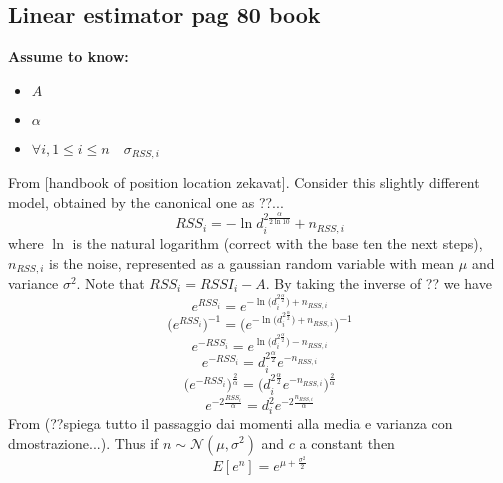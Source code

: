 \documentclass[12pt]{report}
\begin{document}
\subsection{Linear estimator pag 80 book}
  \begin{center}
  \textbf{Assume to know:}
  \begin{itemize}
    \centering
    \item $A$
    \item $\alpha$
    \item $\forall i , 1\leq i\leq n\quad \sigma_{RSS,i}$
  \end{itemize}
  \end{center}
From [handbook of position location zekavat]. Consider this slightly different model, obtained by the canonical one as ??...
\begin{equation}
    RSS_i=-\ln{d_i^{2\frac{\alpha}{2\ln{10}}}}+n_{RSS,i}
\end{equation}
where $\ln$ is the natural logarithm (correct with the base ten the next steps), $n_{RSS,i}$ is the noise, represented as a gaussian random variable with mean $\mu$ and variance $\sigma^2$. Note that $RSS_i=RSSI_i-A$. By taking the inverse of ?? we have 
\begin{equation}
    e^{RSS_i}=e^{-\ln\big(d_i^{2\frac{\alpha}{2}}\big)+n_{RSS,i}}
\end{equation}
\begin{equation}
    \bigg(e^{RSS_i}\bigg)^{-1}=\bigg(e^{-\ln\big(d_i^{2\frac{\alpha}{2}}\big)+n_{RSS,i}}\bigg)^{-1}
\end{equation}
\begin{equation}
    e^{-RSS_i}=e^{\ln\big(d_i^{2\frac{\alpha}{2}}\big)-n_{RSS,i}}
\end{equation}
\begin{equation}
    e^{-RSS_i}=d_i^{2\frac{\alpha}{2}}e^{-n_{RSS,i}}
\end{equation}
\begin{equation}
    \bigg(e^{-RSS_i}\bigg)^{\frac{2}{\alpha}}=\bigg(d_i^{2\frac{\alpha}{2}}e^{-n_{RSS,i}}\bigg)^{\frac{2}{\alpha}}
\end{equation}
\begin{equation}
    e^{-2\frac{RSS_i}{\alpha}}=d_i^2e^{-2\frac{n_{RSS,i}}{\alpha}}
\end{equation}
From \cite{Beran2011} (??spiega tutto il passaggio dai momenti alla media e varianza con dmostrazione...).  Thus if $n\sim\mathcal{N}(\mu,\sigma^2)$ and $c$ a constant then
\begin{equation}
    E[e^n]=e^{\mu+\frac{\sigma^2}{2}}
\end{equation}
\end{document}
